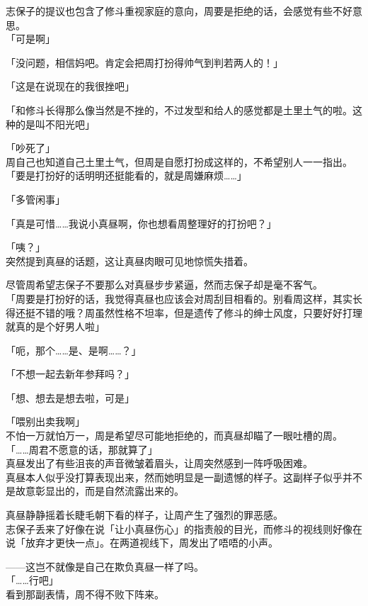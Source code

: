 志保子的提议也包含了修斗重视家庭的意向，周要是拒绝的话，会感觉有些不好意思。\\

「可是啊」

「没问题，相信妈吧。肯定会把周打扮得帅气到判若两人的！」

「这是在说现在的我很挫吧」

「和修斗长得那么像当然是不挫的，不过发型和给人的感觉都是土里土气的啦。这种的是叫不阳光吧」

「吵死了」\\

周自己也知道自己土里土气，但周是自愿打扮成这样的，不希望别人一一指出。\\

「要是打扮好的话明明还挺能看的，就是周嫌麻烦……」

「多管闲事」

「真是可惜……我说小真昼啊，你也想看周整理好的打扮吧？」

「咦？」\\

突然提到真昼的话题，这让真昼肉眼可见地惊慌失措着。

尽管周希望志保子不要那么对真昼步步紧逼，然而志保子却是毫不客气。\\

「周要是打扮好的话，我觉得真昼也应该会对周刮目相看的。别看周这样，其实长得还挺不错的哦？周虽然性格不坦率，但是遗传了修斗的绅士风度，只要好好打理就真的是个好男人啦」

「呃，那个……是、是啊……？」

「不想一起去新年参拜吗？」

「想、想去是想去啦，可是」

「喂别出卖我啊」\\

不怕一万就怕万一，周是希望尽可能地拒绝的，而真昼却瞄了一眼吐槽的周。\\

「……周君不愿意的话，那就算了」\\

真昼发出了有些沮丧的声音微皱着眉头，让周突然感到一阵呼吸困难。\\

真昼本人似乎没打算表现出来，然而她明显是一副遗憾的样子。这副样子似乎并不是故意彰显出的，而是自然流露出来的。

真昼静静摇着长睫毛朝下看的样子，让周产生了强烈的罪恶感。\\

志保子丢来了好像在说「让小真昼伤心」的指责般的目光，而修斗的视线则好像在说「放弃才更快一点」。在两道视线下，周发出了唔唔的小声。

——这岂不就像是自己在欺负真昼一样了吗。\\

「……行吧」\\

看到那副表情，周不得不败下阵来。
